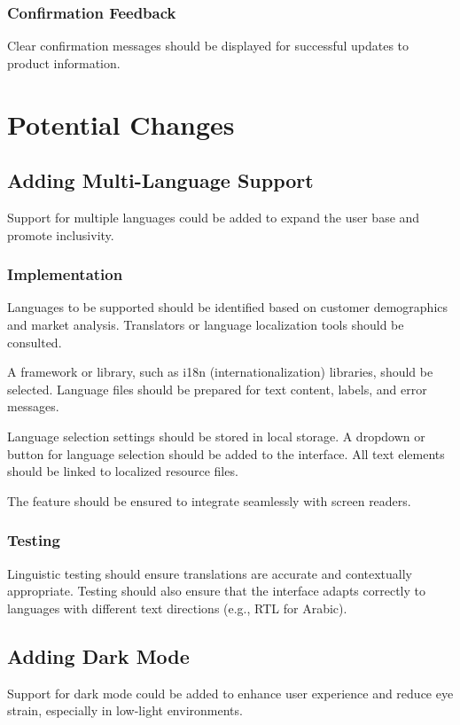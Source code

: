 \documentclass[twoside,a4paper,journal]{IEEEtran}
\begin{document}
\subsubsection{Confirmation Feedback}
Clear confirmation messages should be displayed for successful updates to
product information.

\section{Potential Changes}
\subsection{Adding Multi-Language Support}
Support for multiple languages could be added to expand the user base and
promote inclusivity.

\subsubsection{Implementation}
Languages to be supported should be identified based on customer demographics
and market analysis. Translators or language localization tools should be
consulted.

A framework or library, such as i18n (internationalization) libraries, should
be selected. Language files should be prepared for text content,
labels, and error messages.

Language selection settings should be stored in local storage.
A dropdown or button for language selection should be added to the interface.
All text elements should be linked to localized resource files.

The feature should be ensured to
integrate seamlessly with screen readers.

\subsubsection{Testing}
Linguistic testing should ensure translations are accurate and contextually
appropriate.
Testing should also ensure that the interface adapts correctly to languages
with different text directions (e.g., RTL for Arabic).

\subsection{Adding Dark Mode}
Support for dark mode could be added to enhance user experience and reduce eye
strain, especially in low-light environments.
\end{document}
